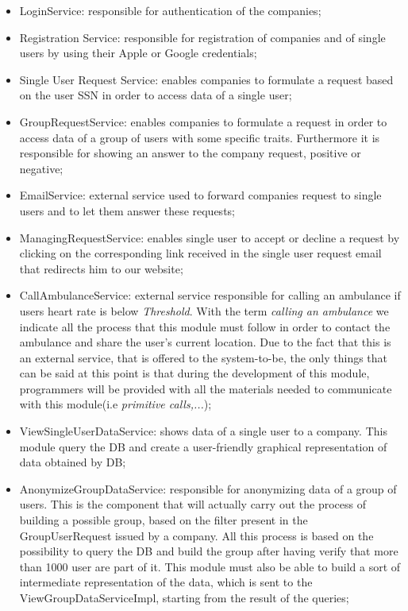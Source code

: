 \documentclass{article}
\begin{document}
\begin{itemize}
\item LoginService: responsible for authentication of the companies;
\item Registration Service: responsible for registration of companies and of single users by using their Apple or Google credentials;
\item Single User Request Service: enables companies to formulate a request based on the user SSN in order to access data of a single user;
\item GroupRequestService: enables companies to formulate a request in order to access data of a group of users with some specific traits. Furthermore it is responsible for showing an answer to the company request, positive or negative;
\item EmailService: external service used to forward companies request to single users and to let them answer these requests;
\item ManagingRequestService: enables single user to accept or decline a request by clicking on the corresponding link received in the single user request email that redirects him to our website;
\item CallAmbulanceService: external service responsible for calling an ambulance if users heart rate is below \emph{Threshold}. With the term \emph{calling an ambulance} we indicate all the process that this module must follow in order to contact the ambulance and share the user's current location. Due to the fact that this is an external service, that is offered to the system-to-be, the only things that can be said at this point is that during the development of this module, programmers will be provided with all the materials needed to communicate with this module(i.e \emph{primitive calls,...});
\item ViewSingleUserDataService: shows data of a single user to a company. This module query the DB and create a user-friendly graphical representation of data obtained by DB;
\item AnonymizeGroupDataService: responsible for anonymizing data of a group of users. This is the component that will actually carry out the process of building a possible group, based on the filter present in the GroupUserRequest issued by a company. All this process is based on the possibility to query the DB and build the group after having verify that more than 1000 user are part of it. This module must also be able to build a sort of intermediate representation of the data, which is sent to the ViewGroupDataServiceImpl, starting from the result of the queries;

\end{itemize}
\end{document}
